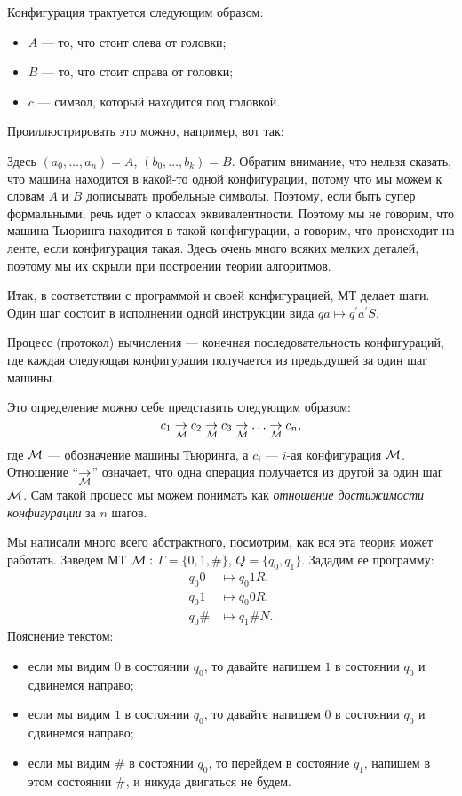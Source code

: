 Конфигурация трактуется следующим образом:
\begin{itemize}
    \item $A$ --- то, что стоит слева от головки;
    \item $B$ --- то, что стоит справа от головки;
    \item $c$ --- символ, который находится под головкой.
\end{itemize}
Проиллюстрировать это можно, например, вот так:



Здесь $\left(a_{0}, \ldots, a_{n}\right) = A$, $\left(b_{0}, \ldots, b_{k}\right) = B$.
Обратим внимание, что нельзя сказать, что машина находится в какой-то одной конфигурации, потому что мы можем к словам $A$ и $B$ дописывать пробельные символы.
Поэтому, если быть супер формальными, речь идет о классах эквивалентности.
Поэтому мы не говорим, что машина Тьюринга находится в такой конфигурации, а говорим, что происходит на ленте, если конфигурация такая.
Здесь очень много всяких мелких деталей, поэтому мы их скрыли при построении теории алгоритмов.

Итак, в соответствии с программой и своей конфигурацией, МТ делает шаги.
Один шаг состоит в исполнении одной инструкции вида $q a \mapsto q^{\prime} a^{\prime} S$.

\begin{definition}
    Процесс (протокол) вычисления --- конечная последовательность конфигураций, где каждая следующая конфигурация получается из предыдущей за один шаг машины.
\end{definition}

Это определение можно себе представить следующим образом:
$$
    c_{1} \underset{\mathcal{M}}{\to} c_{2} \underset{\mathcal{M}}{\to} c_{3} \underset{\mathcal{M}}{\to} \ldots \underset{\mathcal{M}}{\to} c_{n},
$$
где $\mathcal{M}$ --- обозначение машины Тьюринга, а $c_{i}$ --- $i$-ая конфигурация $\mathcal{M}$.
Отношение \enquote{$\underset{\mathcal{M}}{\to}$} означает, что одна операция получается из другой за один шаг $\mathcal{M}$.
Сам такой процесс мы можем понимать как {\it отношение достижимости конфигурации} за $n$ шагов.

Мы написали много всего абстрактного, посмотрим, как вся эта теория может работать.
Заведем МТ $\mathcal{M}:$ $\Gamma = \{0, 1, \#\}$, $Q = \{q_{0}, q_{1}\}$.
Зададим ее программу:
\begin{align}
    q_{0} 0 &\mapsto q_{0} 1 R, \\
    q_{0} 1 &\mapsto q_{0} 0 R, \\
    q_{0} \# &\mapsto q_{1} \# N.
\end{align}
Пояснение текстом:
\begin{itemize}
    \item если мы видим $0$ в состоянии $q_{0}$, то давайте напишем $1$ в состоянии $q_{0}$ и сдвинемся направо;
    \item если мы видим $1$ в состоянии $q_{0}$, то давайте напишем $0$ в состоянии $q_{0}$ и сдвинемся направо;
    \item если мы видим \# в состоянии $q_{0}$, то перейдем в состояние $q_{1}$, напишем в этом состоянии \#, и никуда двигаться не будем.
\end{itemize}

